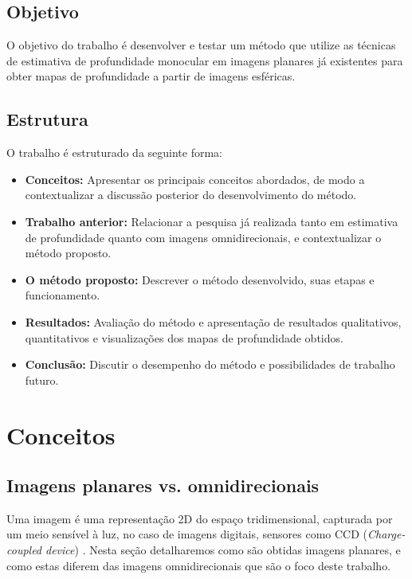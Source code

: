 \documentclass[cic,tc]{iiufrgs}
\begin{document}
\section{Objetivo}

O objetivo do trabalho é desenvolver e testar um método que utilize as técnicas de estimativa de profundidade monocular em imagens planares já existentes para obter mapas de profundidade a partir de imagens esféricas.

\section{Estrutura}

O trabalho é estruturado da seguinte forma:

\begin{itemize}
\item \textbf{Conceitos:} Apresentar os principais conceitos abordados, de modo a contextualizar a discussão posterior do desenvolvimento do método.
\item \textbf{Trabalho anterior:} Relacionar a pesquisa já realizada tanto em estimativa de profundidade quanto com imagens omnidirecionais, e contextualizar o método proposto.
\item \textbf{O método proposto:} Descrever o método desenvolvido, suas etapas e funcionamento.
\item \textbf{Resultados:} Avaliação do método e apresentação de resultados qualitativos, quantitativos e visualizações dos mapas de profundidade obtidos.
\item \textbf{Conclusão:} Discutir o desempenho do método e possibilidades de trabalho futuro.
\end{itemize}

\chapter{Conceitos}

\section{Imagens planares vs. omnidirecionais}

Uma imagem é uma representação 2D do espaço tridimensional, capturada por um meio sensível à luz, no caso de imagens digitais, sensores como CCD (\textit{Charge-coupled device}) \citep{Gonzalez}. Nesta seção detalharemos como são obtidas imagens planares, e como estas diferem das imagens omnidirecionais que são o foco deste trabalho.
\end{document}

